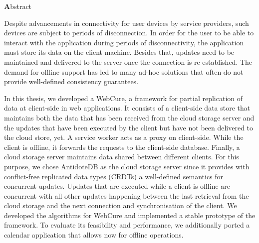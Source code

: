 \begin{center}
{\Large \textbf Abstract}
\end{center}
\vspace{1cm}

Despite advancements in connectivity for user devices by service providers, such devices are subject to periods of disconnection. In order for the user to be able to interact with the application during periods of disconnectivity, the application must store its data on the client machine. Besides that, updates need to be maintained and delivered to the server once the connection is re-established. The demand for offline support has led to many ad-hoc solutions that often do not provide well-defined consistency guarantees. 

In this thesis, we developed a WebCure, a framework for partial replication of data at client-side in web applications. It consists of a client-side data store that maintains both the data that has been received from the cloud storage server and the updates that have been executed by the client but have not been delivered to the cloud store, yet. A service worker acts as a proxy on client-side. While the client is offline, it forwards the requests to the client-side database. Finally, a cloud storage server maintains data shared between different clients. For this purpose, we chose AntidoteDB as the cloud storage server since it provides with conflict-free replicated data types (CRDTs) a well-defined semantics for concurrent updates. Updates that are executed while a client is offline are concurrent with all other updates happening between the last retrieval from the cloud storage and the next connection and synchronisation of the client. We developed the algorithms for WebCure and implemented a stable prototype of the framework. To evaluate its feasibility and performance, we additionally ported a calendar application that allows now for offline operations.